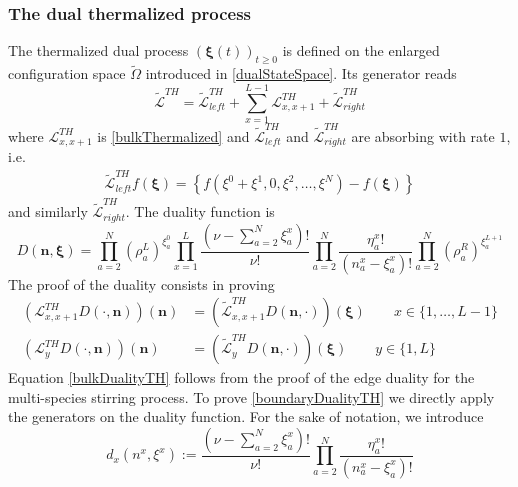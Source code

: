 \documentclass[11pt]{article}
\numberwithin{equation}{section}
\numberwithin{equation}{subsection}
\begin{document}
\subsubsection{The dual thermalized process}
The thermalized dual process $(\bm{\xi}(t))_{t\geq 0}$ is defined on the enlarged configuration space $\widetilde{\Omega}$ introduced in \eqref{dualStateSpace}. Its generator reads
\begin{equation}
		\widetilde{\mathcal{L}}^{TH}=\widetilde{\mathcal{L}}_{left}^{TH}+\sum_{x=1}^{L-1}\mathcal{L}_{x,x+1}^{TH}+\widetilde{\mathcal{L}}_{right}^{TH}
\end{equation}
where $\mathcal{L}^{TH}_{x,x+1}$ is \eqref{bulkThermalized} and $\widetilde{\mathcal{L}}_{left}^{TH}$ and $\widetilde{\mathcal{L}}_{right}^{TH}$ are absorbing with rate $1$, i.e. 
\begin{equation}
	\begin{split}
		\widetilde{\mathcal{L}}_{left}^{TH}f(\bm{\xi})=\left\{f(\xi^{0}+\xi^{1},0,\xi^{2},\ldots,\xi^{N})-f(\bm{\xi})\right\}
	\end{split}
\end{equation}
and similarly $\widetilde{\mathcal{L}}_{right}^{TH}$. 
The duality function is 
\begin{equation}
	D(\bm{n},\bm{\xi})=\prod_{a=2}^{N}\left(\rho_{a}^{L}\right)^{\xi_{a}^{0}}\prod_{x=1}^{L}\frac{(\nu-\sum_{a=2}^{N}\xi_{a}^{x})!}{\nu!}\prod_{a=2}^{N}\frac{\eta_{a}^{x}!}{(n_{a}^{x}-\xi_{a}^{x})!}\prod_{a=2}^{N}\left(\rho_{a}^{R}\right)^{\xi_{a}^{L+1}}
\end{equation}
The proof of the duality consists in proving 
\begin{align}
	\left(\mathcal{L}_{x,x+1}^{TH}D(\cdot,\bm{n})\right)(\bm{n})&=\left(\widetilde{\mathcal{L}}_{x,x+1}^{TH}D(\bm{n},\cdot)\right)(\bm{\xi})\qquad x\in \{1,\ldots,L-1\}\label{bulkDualityTH}\\
	\left(\mathcal{L}_{y}^{TH}D(\cdot,\bm{n})\right)(\bm{n})&=\left(\widetilde{\mathcal{L}}_{y}^{TH}D(\bm{n},\cdot)\right)(\bm{\xi})\qquad y\in\{1,L\}\label{boundaryDualityTH}
\end{align}
Equation \eqref{bulkDualityTH} follows from the proof of the edge duality for the multi-species stirring process. To prove \eqref{boundaryDualityTH} we directly apply the generators on the duality function. For the sake of notation, we introduce 
\begin{equation}
	d_{x}(n^{x},\xi^{x}):=\frac{(\nu-\sum_{a=2}^{N}\xi_{a}^{x})!}{\nu!}\prod_{a=2}^{N}\frac{\eta_{a}^{x}!}{(n_{a}^{x}-\xi_{a}^{x})!}
\end{equation}
\end{document}
